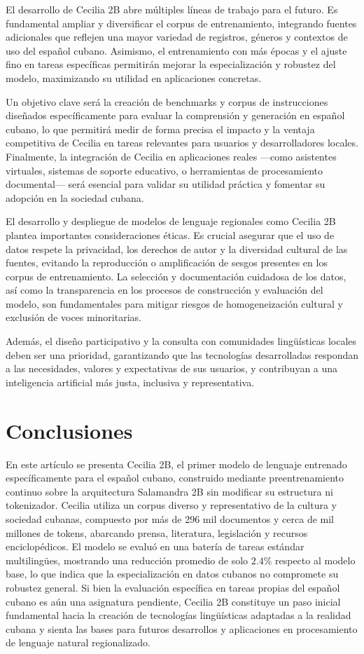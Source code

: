 \documentclass[10pt,twoside]{rcmart} %
\begin{document}
El desarrollo de Cecilia 2B abre múltiples líneas de trabajo para el futuro. Es fundamental ampliar y diversificar el corpus de entrenamiento, integrando fuentes adicionales que reflejen una mayor variedad de registros, géneros y contextos de uso del español cubano. Asimismo, el entrenamiento con más épocas y el ajuste fino en tareas específicas permitirán mejorar la especialización y robustez del modelo, maximizando su utilidad en aplicaciones concretas.

Un objetivo clave será la creación de benchmarks y corpus de instrucciones diseñados específicamente para evaluar la comprensión y generación en español cubano, lo que permitirá medir de forma precisa el impacto y la ventaja competitiva de Cecilia en tareas relevantes para usuarios y desarrolladores locales. Finalmente, la integración de Cecilia en aplicaciones reales —como asistentes virtuales, sistemas de soporte educativo, o herramientas de procesamiento documental— será esencial para validar su utilidad práctica y fomentar su adopción en la sociedad cubana.

El desarrollo y despliegue de modelos de lenguaje regionales como Cecilia 2B plantea importantes consideraciones éticas. Es crucial asegurar que el uso de datos respete la privacidad, los derechos de autor y la diversidad cultural de las fuentes, evitando la reproducción o amplificación de sesgos presentes en los corpus de entrenamiento. La selección y documentación cuidadosa de los datos, así como la transparencia en los procesos de construcción y evaluación del modelo, son fundamentales para mitigar riesgos de homogeneización cultural y exclusión de voces minoritarias.

Además, el diseño participativo y la consulta con comunidades lingüísticas locales deben ser una prioridad, garantizando que las tecnologías desarrolladas respondan a las necesidades, valores y expectativas de sus usuarios, y contribuyan a una inteligencia artificial más justa, inclusiva y representativa.

\section{Conclusiones}

En este artículo se presenta Cecilia 2B, el primer modelo de lenguaje entrenado específicamente para el español cubano, construido mediante preentrenamiento continuo sobre la arquitectura Salamandra 2B sin modificar su estructura ni tokenizador. Cecilia utiliza un corpus diverso y representativo de la cultura y sociedad cubanas, compuesto por más de 296 mil documentos y cerca de mil millones de tokens, abarcando prensa, literatura, legislación y recursos enciclopédicos. El modelo se evaluó en una batería de tareas estándar multilingües, mostrando una reducción promedio de solo $2.4$\% respecto al modelo base, lo que indica que la especialización en datos cubanos no compromete su robustez general. Si bien la evaluación específica en tareas propias del español cubano es aún una asignatura pendiente, Cecilia 2B constituye un paso inicial fundamental hacia la creación de tecnologías lingüísticas adaptadas a la realidad cubana y sienta las bases para futuros desarrollos y aplicaciones en procesamiento de lenguaje natural regionalizado.
\end{document}
